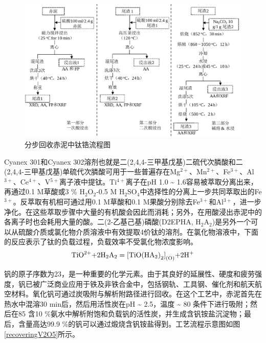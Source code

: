 \begin{figure}[!h]
	\centering
	\vspace{15pt}
	\setlength{\abovecaptionskip}{30pt plus0.3ex minus 0.06ex}
	\includegraphics[width=\linewidth]{Figures/c1/Figure9}
	\caption{分步回收赤泥中钛锆流程图}\label{recoveringTiZr}
\end{figure}

Cyanex 301和Cyanex 302溶剂也就是二(2,4,4-三甲基戊基)二硫代次膦酸和二(2,4,4-三甲基戊基)单硫代次膦酸可用于一些普遍存在Mg$ ^{\mathrm{2+}} $、Mn$ ^{\mathrm{2+}} $、Fe$ ^{\mathrm{3+}} $、Al$ ^{\mathrm{3+}} $、Ce$ ^{\mathrm{4+}} $、V$ ^{\mathrm{5+}} $离子液中提钛\cite{deep2001extraction}。Ti$ ^{\mathrm{4+}} $离子在pH 1.0 \textasciitilde{ }1.6容易被萃取分离出来，再通过0.1 M草酸或3 \% H$ _{\mathrm{2}} $O$ _{\mathrm{2}} $-0.5 M H$ _{\mathrm{2}} $SO$ _{\mathrm{4}} $中选择性的分离上一步共同萃取出的Fe$ ^{\mathrm{3+}} $。反萃取有机相可通过用0.1 M草酸和0.1 M果酸分别除去Fe$ ^{\mathrm{3+}} $和Al$ ^{\mathrm{3+}} $，进一步净化。在这些萃取步骤中大量的有机酸会因此而消耗；另外，在用酸浸出赤泥中的各离子时也会耗用大量的酸。二(2-乙基己基)磷酸(D2EPHA, H$ _{\mathrm{2}} $A$ _{\mathrm{2}} $)是另外一个可以从硫酸介质\cite{islam1981solvent}或氯化物介质溶液\cite{islam1981solvent,biswas1998solvent}中有效提取4价钛的溶剂。在氯化物溶液中，下面的反应表示了钛的负载过程，负载效率不受氯化物浓度影响。
\begin{equation}
{\rm{Ti}}{{\rm{O}}^{{\rm{2 + }}}}{\rm{ + 2}}{{\rm{H}}_{\rm{2}}}{{\rm{A}}_{\rm{2}}} = {\left[ {{\rm{TiO}}{{\left( {{\rm{H}}{{\rm{A}}_{\rm{2}}}} \right)}_{\rm{2}}}} \right]_{{\rm{(O)}}}}{\rm{ + 2}}{{\rm{H}}^{\rm{ + }}}
\end{equation}

钒的原子序数为23，是一种重要的化学元素。由于其良好的延展性、硬度和疲劳强度，钒已被广泛商业应用于铁及非铁合金中，包括钢轨、工具钢、催化剂和航天航空材料\cite{moskalyk2003processing}。氧化钒可通过炭吸附与解析附路径进行回收\cite{mukherjee1990recovery}。在这个工艺中，赤泥首先在热水中混溶30 min后，然后用活性炭在pH  \textasciitilde{ }2.5，温度 \textasciitilde{ }80 \textcelsius 条件下进行吸附；然后在85 \textcelsius 含10 \%氨水中解析附饱和负载钒的活性炭，并生成含钒铵盐沉淀物；最后，含量高达99.9 \%的钒可以通过煅烧含钒铵盐得到。工艺流程示意图如图\ref{recoveringV2O5}所示。

